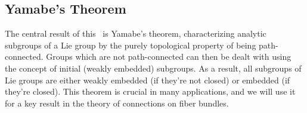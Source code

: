 




\subsection{Yamabe's Theorem}\label{sec: Yamabe's theorem}

The central result of this \subsect\ is Yamabe's theorem, characterizing analytic subgroups of a Lie group by the purely topological property of being path-connected. Groups which are not path-connected can then be dealt with using the concept of initial (weakly embedded) subgroups. As a result, all subgroups of Lie groups are either weakly embedded (if they're not closed) or embedded (if they're closed). This theorem is crucial in many applications, and we will use it for a key result in the theory of connections on fiber bundles.


